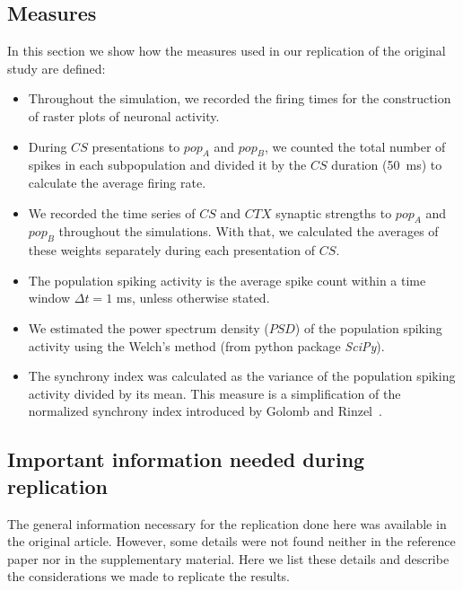 \subsection*{Measures}\label{sec:measures}
In this section we show how the measures used in our replication of the original study are defined:

\begin{itemize}
    \item Throughout the simulation, we recorded the firing times for the construction of raster plots of neuronal activity.
    
    \item During $CS$ presentations to $pop_A$ and $pop_B$, we counted the total number of spikes in each subpopulation and divided it by the $CS$ duration (50~ms) to calculate the average firing rate.
    
    \item We recorded the time series of $CS$ and $CTX$ synaptic strengths to $pop_A$ and $pop_B$ throughout the simulations. With that, we calculated the averages of these weights separately during each presentation of $CS$.
    
    \item The population spiking activity is the average spike count within a time window $\Delta t = 1$ ms, unless otherwise stated.
    
    \item We estimated the power spectrum density ($PSD$) of the population spiking activity using the Welch's method (from python package \textit{SciPy}).
    
    \item The synchrony index was calculated as the variance of the population spiking activity divided by its mean. This measure is a simplification of the normalized synchrony index introduced by Golomb and Rinzel~\cite{Golomb1993, Golomb2007}.
    
\end{itemize}

\subsection*{Important information needed during replication}
The general information necessary for the replication done here was available in the original article. However, some details were not found neither in the reference paper nor in the supplementary material. Here we list these details and describe the considerations we made to replicate the results.


